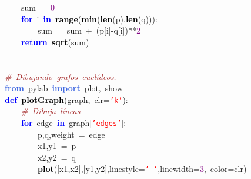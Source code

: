 \mbox{}\ \ \ \ sum\ \textcolor{BrickRed}{=}\ \textcolor{Purple}{0} \\
\mbox{}\ \ \ \ \textbf{\textcolor{Blue}{for}}\ i\ \textbf{\textcolor{Blue}{in}}\ \textbf{\textcolor{Black}{range}}\textcolor{BrickRed}{(}\textbf{\textcolor{Black}{min}}\textcolor{BrickRed}{(}\textbf{\textcolor{Black}{len}}\textcolor{BrickRed}{(}p\textcolor{BrickRed}{),}\textbf{\textcolor{Black}{len}}\textcolor{BrickRed}{(}q\textcolor{BrickRed}{))):} \\
\mbox{}\ \ \ \ \ \ \ \ sum\ \textcolor{BrickRed}{=}\ sum\ \textcolor{BrickRed}{+}\ \textcolor{BrickRed}{(}p\textcolor{BrickRed}{[}i\textcolor{BrickRed}{]-}q\textcolor{BrickRed}{[}i\textcolor{BrickRed}{])**}\textcolor{Purple}{2} \\
\mbox{}\ \ \ \ \textbf{\textcolor{Blue}{return}}\ \textbf{\textcolor{Black}{sqrt}}\textcolor{BrickRed}{(}sum\textcolor{BrickRed}{)} \\
\mbox{} \\
\mbox{} \\
\mbox{}\textit{\textcolor{Brown}{\#\ Dibujando\ grafos\ euclídeos.}} \\
\mbox{}\textbf{\textcolor{RoyalBlue}{from}}\ pylab\ \textbf{\textcolor{RoyalBlue}{import}}\ plot\textcolor{BrickRed}{,}\ show \\
\mbox{}\textbf{\textcolor{Blue}{def}}\ \textbf{\textcolor{Black}{plotGraph}}\textcolor{BrickRed}{(}graph\textcolor{BrickRed}{,}\ clr\textcolor{BrickRed}{=}\texttt{\textcolor{Red}{'k'}}\textcolor{BrickRed}{):} \\
\mbox{}\ \ \ \ \textit{\textcolor{Brown}{\#\ Dibuja\ líneas}} \\
\mbox{}\ \ \ \ \textbf{\textcolor{Blue}{for}}\ edge\ \textbf{\textcolor{Blue}{in}}\ graph\textcolor{BrickRed}{[}\texttt{\textcolor{Red}{'edges'}}\textcolor{BrickRed}{]:} \\
\mbox{}\ \ \ \ \ \ \ \ p\textcolor{BrickRed}{,}q\textcolor{BrickRed}{,}weight\ \textcolor{BrickRed}{=}\ edge \\
\mbox{}\ \ \ \ \ \ \ \ x1\textcolor{BrickRed}{,}y1\ \textcolor{BrickRed}{=}\ p \\
\mbox{}\ \ \ \ \ \ \ \ x2\textcolor{BrickRed}{,}y2\ \textcolor{BrickRed}{=}\ q \\
\mbox{}\ \ \ \ \ \ \ \ \textbf{\textcolor{Black}{plot}}\textcolor{BrickRed}{([}x1\textcolor{BrickRed}{,}x2\textcolor{BrickRed}{],[}y1\textcolor{BrickRed}{,}y2\textcolor{BrickRed}{],}linestyle\textcolor{BrickRed}{=}\texttt{\textcolor{Red}{'-'}}\textcolor{BrickRed}{,}linewidth\textcolor{BrickRed}{=}\textcolor{Purple}{3}\textcolor{BrickRed}{,}\ color\textcolor{BrickRed}{=}clr\textcolor{BrickRed}{)} \\

